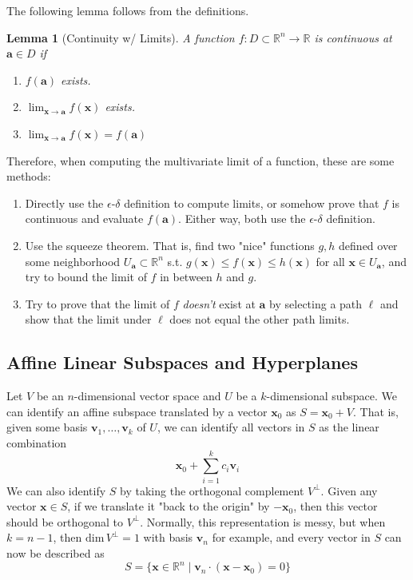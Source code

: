 \documentclass{article}
\newtheorem{lemma}[theorem]{Lemma}
\theoremstyle{remark}
\theoremstyle{definition}
\begin{document}
The following lemma follows from the definitions. 

\begin{lemma}[Continuity w/ Limits]
A function $f: D \subset \mathbb{R}^n \longrightarrow \mathbb{R}$ is continuous at $\mathbf{a} \in D$ if 
\begin{enumerate}
    \item $f(\mathbf{a})$ exists. 
    \item $\lim_{\mathbf{x} \longrightarrow \mathbf{a}} f(\mathbf{x})$ exists. 
    \item $\lim_{\mathbf{x} \longrightarrow \mathbf{a}} f(\mathbf{x}) = f(\mathbf{a})$
\end{enumerate}
\end{lemma}

Therefore, when computing the multivariate limit of a function, these are some methods: 
\begin{enumerate}
    \item Directly use the $\epsilon$-$\delta$ definition to compute limits, or somehow prove that $f$ is continuous and evaluate $f(\mathbf{a})$. Either way, both use the $\epsilon$-$\delta$ definition. 
    
    \item Use the squeeze theorem. That is, find two "nice" functions $g, h$ defined over some neighborhood $U_\mathbf{a} \subset \mathbb{R}^n$ s.t. $g (\mathbf{x}) \leq f (\mathbf{x}) \leq h(\mathbf{x})$ for all $\mathbf{x} \in U_\mathbf{a}$, and try to bound the limit of $f$ in between $h$ and $g$. 
    
    \item Try to prove that the limit of $f$ \textit{doesn't} exist at $\mathbf{a}$ by selecting a path $\ell$ and show that the limit under $\ell$ does not equal the other path limits. 
\end{enumerate}

\subsection{Affine Linear Subspaces and Hyperplanes}

Let $V$ be an $n$-dimensional vector space and $U$ be a $k$-dimensional subspace. We can identify an affine subspace translated by a vector $\mathbf{x}_0$ as $S = \mathbf{x}_0 + V$. That is, given some basis $\mathbf{v}_1, \ldots, \mathbf{v}_k$ of $U$, we can identify all vectors in $S$ as the linear combination
\[\mathbf{x}_0 + \sum_{i=1}^k c_i \mathbf{v}_i\]
We can also identify $S$ by taking the orthogonal complement $V^\perp$. Given any vector $\mathbf{x} \in S$, if we translate it "back to the origin" by $-\mathbf{x}_0$, then this vector should be orthogonal to $V^\perp$. Normally, this representation is messy, but when $k = n-1$, then $\mathrm{dim}\, V^\perp = 1$ with basis $\mathbf{v}_n$ for example, and every vector in $S$ can now be described as 
\[S = \{\mathbf{x} \in \mathbb{R}^n \mid \mathbf{v}_n \cdot (\mathbf{x} - \mathbf{x}_0) = 0\}\]
\end{document}
